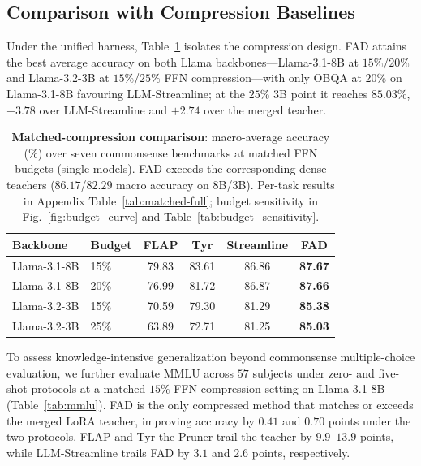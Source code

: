 \documentclass[letterpaper]{article} %
\theoremstyle{plain}
\theoremstyle{definition}
\begin{document}
\subsection{Comparison with Compression Baselines}
\label{sec:baselines}
Under the unified harness,
Table~\ref{tab:matched-baselines} isolates the compression design. FAD attains
the best average accuracy on both Llama backbones---Llama-3.1-8B at
$15\%$/$20\%$ and Llama-3.2-3B at $15\%$/$25\%$ FFN compression---with only OBQA
at $20\%$ on Llama-3.1-8B favouring LLM-Streamline; at the $25\%$ 3B point it
reaches $85.03\%$, $+3.78$ over LLM-Streamline and $+2.74$ over the merged
teacher.

\begin{table}[t]
\centering\small
\setlength{\tabcolsep}{5pt}\renewcommand{\arraystretch}{1.05}
\begin{tabular}{@{}llcccc@{}}
\toprule
\textbf{Backbone} & \textbf{Budget} & \textbf{FLAP} & \textbf{Tyr} & \textbf{Streamline} & \textbf{FAD}\\
\midrule
Llama-3.1-8B & 15\% & 79.83 & 83.61 & 86.86 & \textbf{87.67}\\
Llama-3.1-8B & 20\% & 76.99 & 81.72 & 86.87 & \textbf{87.66}\\
Llama-3.2-3B & 15\% & 70.59 & 79.30 & 81.29 & \textbf{85.38}\\
Llama-3.2-3B & 25\% & 63.89 & 72.71 & 81.25 & \textbf{85.03}\\
\bottomrule
\end{tabular}
\caption{\textbf{Matched-compression comparison}: macro-average accuracy (\%)
over seven commonsense benchmarks at matched FFN budgets (single models).
{FAD exceeds the corresponding dense teachers
($86.17$/$82.29$ macro accuracy on 8B/3B). Per-task results in
Appendix Table~\ref{tab:matched-full}; budget sensitivity in Fig.~\ref{fig:budget_curve} and Table~\ref{tab:budget_sensitivity}.}} \label{tab:matched-baselines}
\end{table}

To assess knowledge-intensive generalization beyond commonsense multiple-choice evaluation, we further evaluate MMLU across $57$ subjects under zero- and five-shot protocols at a matched $15\%$ FFN compression
setting on Llama-3.1-8B (Table~\ref{tab:mmlu}). FAD is the only compressed method that matches or exceeds the merged LoRA teacher, improving accuracy by $0.41$ and $0.70$ points under the two protocols. FLAP and Tyr-the-Pruner
trail the teacher by $9.9$--$13.9$ points, while LLM-Streamline trails FAD by $3.1$ and $2.6$ points, respectively.
\end{document}
